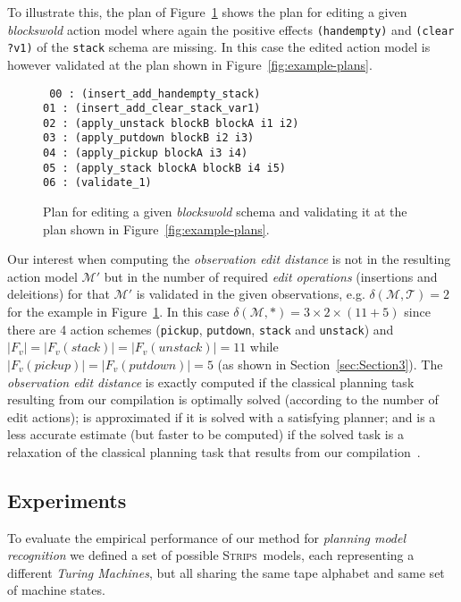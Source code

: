 \documentclass[letterpaper]{article} %
\newcommand{\strips}{\textsc{Strips}}     %
\begin{document}
To illustrate this, the plan of Figure~\ref{fig:plan-pdistance} shows the plan for editing a given {\em blockswold} action model where again the positive effects {\tt\small (handempty)} and {\tt\small (clear ?v1)} of the {\tt\small stack} schema are missing. In this case the edited action model is however validated at the plan shown in Figure~\ref{fig:example-plans}.

\begin{figure}[hbt!]
{\tt\small
00 : (insert\_add\_handempty\_stack)\\
01 : (insert\_add\_clear\_stack\_var1)\\
02 : (apply\_unstack blockB blockA i1 i2)\\
03 : (apply\_putdown blockB i2 i3)\\
04 : (apply\_pickup blockA i3 i4)\\
05 : (apply\_stack blockA blockB i4 i5)\\
06 : (validate\_1)
}
 \caption{\small Plan for editing a given {\em blockswold} schema and validating it at the plan shown in Figure~\ref{fig:example-plans}.}
\label{fig:plan-pdistance}
\end{figure}

Our interest when computing the {\em observation edit distance} is not in the resulting action model $\mathcal{M}'$ but in the number of required {\em edit operations} (insertions and deleitions) for that $\mathcal{M}'$ is validated in the given observations, e.g. $\delta(\mathcal{M},\mathcal{T})=2$ for the example in Figure~\ref{fig:plan-pdistance}. In this case $\delta(\mathcal{M},*)=3\times 2\times (11+5)$ since there are 4 action schemes ({\small\tt pickup}, {\small\tt putdown}, {\small\tt stack} and {\small\tt unstack}) and $|F_v|=|F_v(stack)|=|F_v(unstack)|=11$ while $|F_v(pickup)|=|F_v(putdown)|=5$  (as shown in Section~\ref{sec:Section3}). The {\em observation edit distance} is exactly computed if the classical planning task resulting from our compilation is optimally solved (according to the number of edit actions); is approximated if it is solved with a satisfying planner; and is a less accurate estimate (but faster to be computed) if the solved task is a relaxation of the classical planning task that results from our compilation~\cite{bonet2001planning}.


\subsection{Experiments}
\label{sec:section5}
To evaluate the empirical performance of our method for {\em planning model recognition} we defined a set of possible \strips\ models, each representing a different {\em Turing Machines}, but all sharing the same tape alphabet and same set of machine states.
\end{document}

